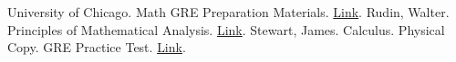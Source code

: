 \begin{thebibliography}{9}
	University of Chicago. Math GRE Preparation Materials. \href{https://math.uchicago.edu/~min/GRE/}{Link}.
	Rudin, Walter. Principles of Mathematical Analysis. \href{https://notendur.hi.is/vae11/\%C3\%9Eekking/principles_of_mathematical_analysis_walter_rudin.pdf}{Link}.
	Stewart, James. Calculus. Physical Copy.
	GRE Practice Test. \href{https://www.ets.org/s/gre/pdf/practice_book_math.pdf}{Link}. 
\end{thebibliography}


